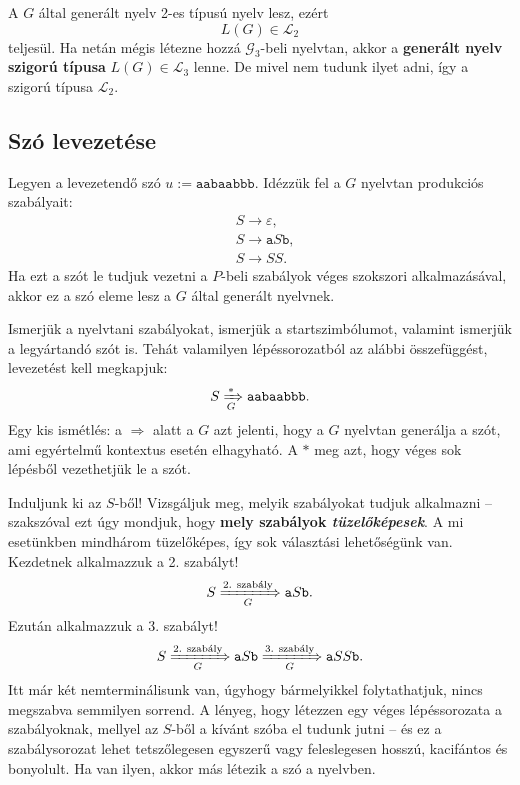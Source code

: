 \documentclass[a4paper,11pt]{article}
\newcommand{\emptyword}{\varepsilon}
\newcommand{\prodrule}[2]{#1 \longrightarrow #2}
\newcommand{\genword}[2]{\xRightarrow[{#1}]{#2}}
\begin{document}
A $G$ által generált nyelv 2-es típusú nyelv lesz, ezért \[L(G) \in \mathcal{L}_2\] teljesül. Ha netán mégis létezne hozzá $\mathcal{G}_3$-beli nyelvtan, akkor a \textbf{generált nyelv szigorú típusa} $L(G) \in \mathcal{L}_3$ lenne. De mivel nem tudunk ilyet adni, így a szigorú típusa $\mathcal{L}_2$.

\newpage

\subsection{Szó levezetése}

	Legyen a levezetendő szó $u := \texttt{aabaabbb}$. Idézzük fel a $G$ nyelvtan produkciós szabályait:
	\begin{align*}
		&\prodrule{S}{\emptyword}, \\
		&\prodrule{S}{\texttt{a}S\texttt{b}}, \\
		&\prodrule{S}{SS}.
	\end{align*}
	Ha ezt a szót le tudjuk vezetni a $P$-beli szabályok véges szokszori alkalmazásával, akkor ez a szó eleme lesz a $G$ által generált nyelvnek.
	
	Ismerjük a nyelvtani szabályokat, ismerjük a startszimbólumot, valamint ismerjük a legyártandó szót is. Tehát valamilyen lépéssorozatból az alábbi összefüggést, levezetést kell megkapjuk:
	\[ S \genword{G}{*} \texttt{aabaabbb}. \]
	Egy kis ismétlés: a $\Longrightarrow$ alatt a $G$ azt jelenti, hogy a $G$ nyelvtan generálja a szót, ami egyértelmű kontextus esetén elhagyható. A $*$ meg azt, hogy véges sok lépésből vezethetjük le a szót.
	
	Induljunk ki az $S$-ből! Vizsgáljuk meg, melyik szabályokat tudjuk alkalmazni -- szakszóval ezt úgy mondjuk, hogy \textbf{mely szabályok \textit{tüzelőképesek}}. A mi esetünkben mindhárom tüzelőképes, így sok választási lehetőségünk van. Kezdetnek alkalmazzuk a 2. szabályt!
	\[ S \genword{G}{\text{2. szabály}} \texttt{a}S\texttt{b}. \]
	Ezután alkalmazzuk a 3. szabályt!
	\[ S \genword{G}{\text{2. szabály}} \texttt{a}S\texttt{b} \genword{G}{\text{3. szabály}} \texttt{a}SS\texttt{b}. \]
	Itt már két nemterminálisunk van, úgyhogy bármelyikkel folytathatjuk, nincs megszabva semmilyen sorrend. A lényeg, hogy létezzen egy véges lépéssorozata a szabályoknak, mellyel az $S$-ből a kívánt szóba el tudunk jutni -- és ez a szabálysorozat lehet tetszőlegesen egyszerű vagy feleslegesen hosszú, kacifántos és bonyolult. Ha van ilyen, akkor más létezik a szó a nyelvben.
	
\end{document}
